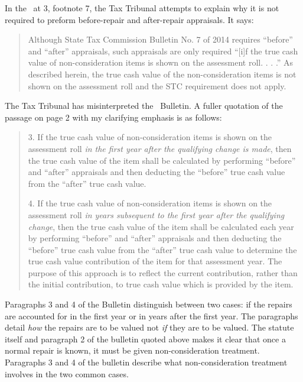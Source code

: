\documentclass[12pt,\documentclassflag]{michiganCourtOfAppealsBrief}
\begin{document}
In the \orderDenying\ at 3, footnote 7, the Tax Tribunal attempts to explain why it is not required to preform before-repair and after-repair appraisals. It says: 

\begin{quote}
	Although State Tax Commission Bulletin No. 7 of 2014 requires ``before'' and ``after'' appraisals, such appraisals are only required ``[i]f the true cash value of non-consideration items is shown on the assessment roll. . . .'' As described herein, the true cash value of the non-consideration items is not shown on the assessment roll	and the STC requirement does not apply.
\end{quote}

The Tax Tribunal has misinterpreted the \STC\ Bulletin. A fuller quotation of the passage on page 2 with my clarifying emphasis is as follows:

\begin{quotation}
3. If the true cash value of non-consideration items is shown on the assessment roll \textit{in the first year after the qualifying change is made}, then the true cash value of the item shall be calculated by performing ``before'' and ``after'' appraisals and then deducting the ``before'' true cash value from the ``after'' true cash value.

4. If the true cash value of non-consideration items is shown on the assessment roll \textit{in years subsequent to the first year after the qualifying change}, then the true cash value of the item shall be calculated each year by performing ``before'' and ``after'' appraisals and then deducting the ``before'' true cash value from the ``after'' true cash value to determine the true cash value contribution of the item for that assessment year. The purpose of this approach is to reflect the current contribution, rather than the initial contribution, to true cash value which is provided by the item.
\end{quotation}

Paragraphs 3 and 4 of the Bulletin distinguish between two cases: if the repairs are accounted for in the first year or in years after the first year. The paragraphs detail \textit{how} the repairs are to be valued not \textit{if} they are to be valued. The statute itself and paragraph 2 of the bulletin quoted above makes it clear that once a normal repair is known, it must be given non-consideration treatment. Paragraphs 3 and 4 of the bulletin describe what non-consideration treatment involves in the two common cases.
\end{document}
